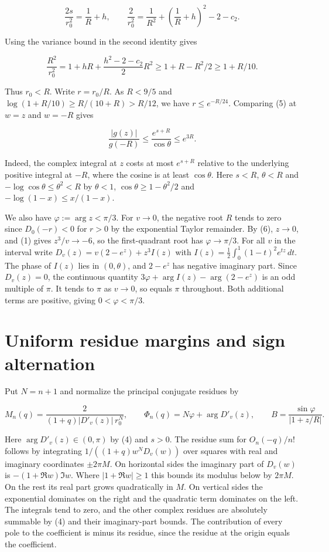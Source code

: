 \documentclass[11pt]{article}
\begin{document}
\[
\frac{2s}{r_0^2}=\frac1R+h,
\qquad
\frac{2}{r_0^2}=\frac1{R^2}+\left(\frac1R+h\right)^2-2-c_2 .
\]

Using the variance bound in the second identity gives

\[
\frac{R^2}{r_0^2}
=1+hR+\frac{h^2-2-c_2}{2}R^2
\ge 1+R-R^2/2
\ge 1+R/10 .
\tag{6}
\]

Thus $r_0<R$. Write $r=r_0/R$. As $R<9/5$ and $\log(1+R/10)\ge R/(10+R)>R/12$, we have $r\le e^{-R/24}$. Comparing (5) at $w=z$ and $w=-R$ gives

\[
\frac{|g(z)|}{g(-R)}
\le\frac{e^{s+R}}{\cos\theta}\le e^{3R}.
\tag{7}
\]

Indeed, the complex integral at $z$ costs at most $e^{s+R}$ relative to the underlying positive integral at $-R$, where the cosine is at least $\cos\theta$. Here $s<R$, $\theta<R$ and $-\log\cos\theta\le\theta^2<R$ by $\theta<1$, $\cos\theta\ge1-\theta^2/2$ and $-\log(1-x)\le x/(1-x)$.

We also have $\varphi:=\arg z<\pi/3$. For $v\to0$, the negative root $R$ tends to zero since $D_0(-r)<0$ for $r>0$ by the exponential Taylor remainder. By (6), $z\to0$, and (1) gives $z^3/v\to-6$, so the first-quadrant root has $\varphi\to\pi/3$. For all $v$ in the interval write $D_v(z)=v(2-e^z)+z^3 I(z)$ with $I(z)=\frac12\int_0^1(1-t)^2 e^{tz}\,dt$. The phase of $I(z)$ lies in $(0,\theta)$, and $2-e^z$ has negative imaginary part. Since $D_v(z)=0$, the continuous quantity $3\varphi+\arg I(z)-\arg(2-e^z)$ is an odd multiple of $\pi$. It tends to $\pi$ as $v\to0$, so equals $\pi$ throughout. Both additional terms are positive, giving $0<\varphi<\pi/3$.

\section{Uniform residue margins and sign alternation}

Put $N=n+1$ and normalize the principal conjugate residues by

\[
M_n(q)=\frac{2}{(1+q)|D'_v(z)|\,r_0^N},\qquad
\Phi_n(q)=N\varphi+\arg D'_v(z),\qquad
B=\frac{\sin\varphi}{|1+z/R|}.
\]

Here $\arg D'_v(z)\in(0,\pi)$ by (4) and $s>0$. The residue sum for $O_n(-q)/n!$ follows by integrating $1/((1+q)w^N D_v(w))$ over squares with real and imaginary coordinates $\pm 2\pi M$. On horizontal sides the imaginary part of $D_v(w)$ is $-(1+\Re w)\Im w$. Where $|1+\Re w|\ge1$ this bounds its modulus below by $2\pi M$. On the rest its real part grows quadratically in $M$. On vertical sides the exponential dominates on the right and the quadratic term dominates on the left. The integrals tend to zero, and the other complex residues are absolutely summable by (4) and their imaginary-part bounds. The contribution of every pole to the coefficient is minus its residue, since the residue at the origin equals the coefficient.
\end{document}

